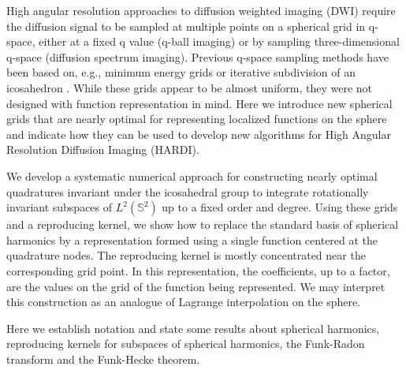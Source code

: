 \documentclass[landscape,a0b,final]{a0poster}
\newenvironment{poster}{
  \begin{center}
  \begin{minipage}[c]{0.98\textwidth}
}{
  \end{minipage} 
  \end{center}
}
\newcommand{\pbox}[4]{
\psshadowbox[#3]{
\begin{minipage}[t][#2][t]{#1}
#4
\end{minipage}
}}
\newcommand{\header}[1]{
\begin{center}\pbox{0.8\columnwidth}{}{linewidth=1mm,framearc=0.1,linecolor=lightblue,fillstyle=gradient,gradangle=0,gradbegin=white,gradend=whiteblue,gradmidpoint=1.0,framesep=1em}{\begin{center}\bf{#1}\end{center}}\end{center}
}
\begin{document}
\begin{poster}
\begin{multicols}{3}
\header{Introduction}

High angular resolution approaches to diffusion weighted imaging (DWI) require
the diffusion signal to be sampled at multiple points on a spherical grid in
q-space, either at a fixed q value (q-ball imaging) or by sampling
three-dimensional q-space (diffusion spectrum imaging). Previous q-space
sampling methods have been based on, e.g., minimum energy grids or iterative
subdivision of an icosahedron \cite{TUCH-2004}. While these grids appear to be
almost uniform, they were not designed with function representation in
mind. Here we introduce new spherical grids that are nearly optimal for
representing localized functions on the sphere and indicate how they can be
used to develop new algorithms for High Angular Resolution Diffusion Imaging
(HARDI).

\hspace{1cm} We develop a systematic numerical approach for constructing
nearly optimal quadratures invariant under the icosahedral group to
integrate rotationally invariant subspaces of $L^{2}\left(\mathbb{S}^{2}\right)$
up to a fixed order and degree. Using these grids and a reproducing
kernel, we show how to replace the standard basis of spherical harmonics
by a representation formed using a single function centered at the
quadrature nodes. The reproducing kernel is mostly concentrated near 
the corresponding grid point. In this representation, the 
coefficients, up to a factor, are the values on the grid of the function 
being represented. We may interpret this construction as an analogue of 
Lagrange interpolation on the sphere. 


\header{Preliminaries}

Here we establish notation and state some results about spherical harmonics, reproducing kernels for subspaces of spherical harmonics, the Funk-Radon transform and the Funk-Hecke theorem.


\end{multicols}
\end{poster}
\end{document}
